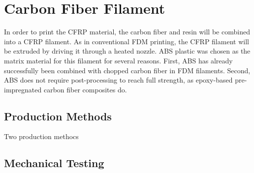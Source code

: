 \section{Carbon Fiber Filament}

In order to print the CFRP material, the carbon fiber and resin will be combined into a CFRP filament. As in conventional FDM printing, the CFRP filament will be extruded by driving it through a heated nozzle. ABS plastic was chosen as the matrix material for this filament for several reasons. First, ABS has already successfully been combined with chopped carbon fiber in FDM filaments. Second, ABS does not require post-processing to reach full strength, as epoxy-based pre-impregnated carbon fiber composites do. 

\subsection{Production Methods}

Two production methocs

\subsection{Mechanical Testing}
